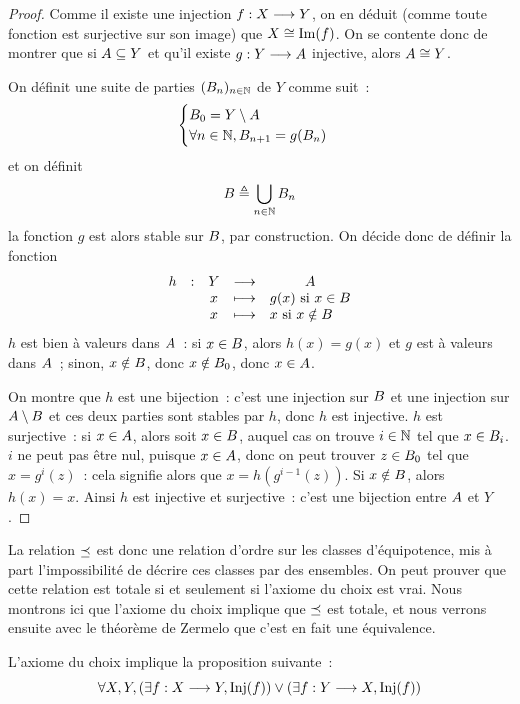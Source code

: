 \begin{proof}
  Comme il existe une injection $f : \displaystyle X \longrightarrow Y$, on en déduit (comme
  toute fonction est surjective sur son image) que $X \cong \operatorname{Im}(f)$. On se
  contente donc de montrer que si $A \subseteq Y$ et qu'il existe
  $g : \displaystyle Y \longrightarrow A$ injective, alors $A \cong Y$.

  On définit une suite de parties $(B_n)_{n\in\mathbb N}$ de $Y$ comme suit~:
  \[\begin{cases}
  B_0 = Y \setminus A\\
  \forall n \in \mathbb N, B_{n+1} = g(B_n)
  \end{cases}\]
  et on définit
  \[B \triangleq \bigcup_{n \in \mathbb N} B_n\]
  la fonction $g$ est alors stable sur $B$, par construction. On décide
  donc de définir la fonction
  \[\makeFunBis{h}{Y}{\varPt}
               {x}{g(x)\text{ si } x \in \varPtB}
               {x}{x \text{ si } x \notin \varPtB}
  \]
  $h$ est bien à valeurs dans $A$~: si $x \in B$, alors $h(x) = g(x)$
  et $g$ est à valeurs dans $A$~; sinon, $x \notin B$, donc
  $x\notin B_0$, donc $x \in A$.

  On montre que $h$ est une bijection~: c'est une injection sur $B$ et une
  injection sur $A\setminus B$ et ces deux parties sont stables par
  $h$, donc $h$ est injective. $h$ est surjective~: si $x \in A$, alors
  soit $x \in B$, auquel cas on trouve $i \in \mathbb N$ tel que
  $x \in B_i$. $i$ ne peut pas être nul, puisque $x \in A$, donc on
  peut trouver $z \in B_0$ tel que $x = g^i(z)$~: cela signifie alors que
  $x = h(g^{i-1}(z))$. Si $x \notin B$, alors $h(x) = x$. Ainsi $h$ est
  injective et surjective~: c'est une bijection entre $A$ et $Y$.
\end{proof}

La relation $\preceq$ est donc une relation d'ordre sur les classes
d'équipotence, mis à part l'impossibilité de décrire ces classes par des
ensembles. On peut prouver que cette relation est totale si et seulement si
l'axiome du choix est vrai. Nous montrons ici que l'axiome du choix implique
que $\preceq$ est totale, et nous verrons ensuite avec le théorème de Zermelo
que c'est en fait une équivalence.

\begin{property}
  L'axiome du choix implique la proposition suivante~:
  \[\forall X,Y,
  (\exists f : \displaystyle X \longrightarrow Y,\operatorname{Inj}(f))\lor
  (\exists f : \displaystyle Y \longrightarrow X,\operatorname{Inj}(f))\]
\end{property}

